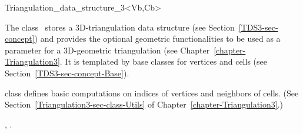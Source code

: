 

\begin{ccRefClass}{Triangulation_data_structure_3<Vb,Cb>}  %


\ccDefinition
The class \ccRefName\ stores a 3D-triangulation data structure
(see Section~\ref{TDS3-sec-concept}) and provides the optional
geometric functionalities to be used as a parameter for a 
3D-geometric triangulation (see Chapter~\ref{chapter-Triangulation3}. 
It is templated by base classes for
vertices and cells (see Section~\ref{TDS3-sec-concept-Base}).


 class defines basic computations on
indices of vertices and neighbors of cells. (See
Section~\ref{Triangulation3-sec-class-Utils} of
Chapter~\ref{chapter-Triangulation3}.)


\ccIsModel


\ccSeeAlso

,
.




\end{ccRefClass}


